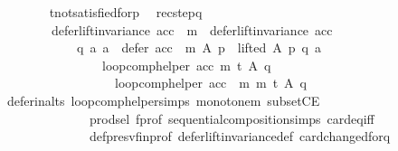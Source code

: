 \begin{isabellebody}
\ \ \ \ \ \ \isamarkupfalse%
\ t{\isacharunderscore}{\kern0pt}not{\isacharunderscore}{\kern0pt}satisfied{\isacharunderscore}{\kern0pt}for{\isacharunderscore}{\kern0pt}p\ \isamarkupfalse%
\ rec{\isacharunderscore}{\kern0pt}step{\isacharunderscore}{\kern0pt}q{\isacharcolon}{\kern0pt}\isanewline
\ \ \ \ \ \ \ \ {\isachardoublequoteopen}{\isacharparenleft}{\kern0pt}defer{\isacharunderscore}{\kern0pt}lift{\isacharunderscore}{\kern0pt}invariance\ {\isacharparenleft}{\kern0pt}acc\ {\isasymtriangleright}\ m{\isacharparenright}{\kern0pt}\ {\isasymand}\ defer{\isacharunderscore}{\kern0pt}lift{\isacharunderscore}{\kern0pt}invariance\ {\isacharparenleft}{\kern0pt}acc{\isacharparenright}{\kern0pt}{\isacharparenright}{\kern0pt}\ {\isasymlongrightarrow}\isanewline
\ \ \ \ \ \ \ \ \ \ \ \ {\isacharparenleft}{\kern0pt}{\isasymforall}q\ a{\isachardot}{\kern0pt}\ {\isacharparenleft}{\kern0pt}a\ {\isasymin}\ {\isacharparenleft}{\kern0pt}defer\ {\isacharparenleft}{\kern0pt}acc\ {\isasymtriangleright}\ m{\isacharparenright}{\kern0pt}\ A\ p{\isacharparenright}{\kern0pt}\ {\isasymand}\ lifted\ A\ p\ q\ a{\isacharparenright}{\kern0pt}\ {\isasymlongrightarrow}\isanewline
\ \ \ \ \ \ \ \ \ \ \ \ \ \ \ \ loop{\isacharunderscore}{\kern0pt}comp{\isacharunderscore}{\kern0pt}helper\ acc\ m\ t\ A\ q\ {\isacharequal}{\kern0pt}\isanewline
\ \ \ \ \ \ \ \ \ \ \ \ \ \ \ \ \ \ loop{\isacharunderscore}{\kern0pt}comp{\isacharunderscore}{\kern0pt}helper\ {\isacharparenleft}{\kern0pt}acc\ {\isasymtriangleright}\ m{\isacharparenright}{\kern0pt}\ m\ t\ A\ q{\isacharparenright}{\kern0pt}{\isachardoublequoteclose}\isanewline
\ \ \ \ \ \ \ \ \isamarkupfalse%
\ defer{\isacharunderscore}{\kern0pt}in{\isacharunderscore}{\kern0pt}alts\ loop{\isacharunderscore}{\kern0pt}comp{\isacharunderscore}{\kern0pt}helper{\isachardot}{\kern0pt}simps{\isacharparenleft}{\kern0pt}{}{\isacharparenright}{\kern0pt}\ monotone{\isacharunderscore}{\kern0pt}m\ subsetCE\isanewline
\ \ \ \ \ \ \ \ \ \ \ \ \ \ prod{\isachardot}{\kern0pt}sel{\isacharparenleft}{\kern0pt}{}{\isacharparenright}{\kern0pt}\ f{\isacharunderscore}{\kern0pt}prof\ sequential{\isacharunderscore}{\kern0pt}composition{\isachardot}{\kern0pt}simps\ card{\isacharunderscore}{\kern0pt}eq{\isacharunderscore}{\kern0pt}{}{\isacharunderscore}{\kern0pt}iff\isanewline
\ \ \ \ \ \ \ \ \ \ \ \ \ \ def{\isacharunderscore}{\kern0pt}presv{\isacharunderscore}{\kern0pt}fin{\isacharunderscore}{\kern0pt}prof\ defer{\isacharunderscore}{\kern0pt}lift{\isacharunderscore}{\kern0pt}invariance{\isacharunderscore}{\kern0pt}def\ card{\isacharunderscore}{\kern0pt}changed{\isacharunderscore}{\kern0pt}for{\isacharunderscore}{\kern0pt}q\isanewline

\end{isabellebody}
